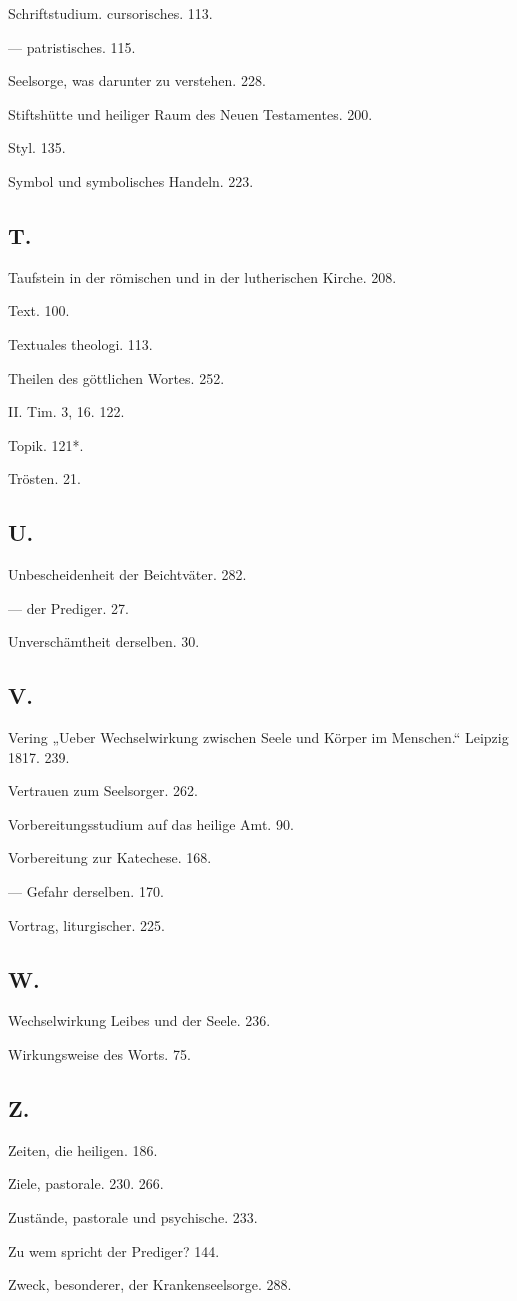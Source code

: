 Schriftstudium. cursorisches. 113.

— patristisches. 115.

Seelsorge, was darunter zu verstehen. 228.

Stiftshütte und heiliger Raum des Neuen Testamentes. 200.

Styl. 135.

Symbol und symbolisches Handeln. 223.

\subsection*{T.}

Taufstein in der römischen und in der lutherischen Kirche. 208.

Text. 100.

Textuales theologi. 113.

Theilen des göttlichen Wortes. 252.

II. Tim. 3, 16. 122.

Topik. 121*.

Trösten. 21.

\subsection*{U.}

Unbescheidenheit der Beichtväter. 282.

— der Prediger. 27.

Unverschämtheit derselben. 30.

\subsection*{V.}

Vering „Ueber Wechselwirkung zwischen Seele und Körper im Menschen.“ Leipzig 1817. 239.

Vertrauen zum Seelsorger. 262.

Vorbereitungsstudium auf das heilige Amt. 90.

Vorbereitung zur Katechese. 168.

— Gefahr derselben. 170.

Vortrag, liturgischer. 225.

\subsection*{W.}

Wechselwirkung Leibes und der Seele. 236.

Wirkungsweise des Worts. 75.

\subsection*{Z.}

Zeiten, die heiligen. 186.

Ziele, pastorale. 230. 266.

Zustände, pastorale und psychische. 233.

Zu wem spricht der Prediger? 144.

Zweck, besonderer, der Krankenseelsorge. 288.

